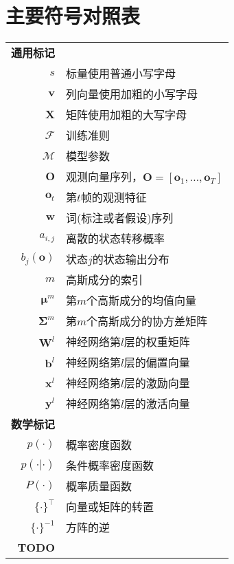 \chapter{主要符号对照表}
\label{chap:symb}

\begin{longtable}{rl}
\textbf{通用标记} \\
$s$ & 标量使用普通小写字母 \\
$\mathbf{v}$ & 列向量使用加粗的小写字母 \\
$\mathbf{X}$ & 矩阵使用加粗的大写字母 \\
$\mathcal{F}$ & 训练准则 \\
$\mathcal{M}$ & 模型参数 \\
$\mathbf{O}$ & 观测向量序列，$\mathbf{O}=[ \mathbf{o}_1, \dots, \mathbf{o}_T ]$ \\
$\mathbf{o}_t$ & 第$t$帧的观测特征 \\
$\mathbf{w}$ & 词(标注或者假设)序列 \\
$a_{i,j}$ & 离散的状态转移概率 \\
$b_j(\mathbf{o})$ & 状态$j$的状态输出分布 \\
$m$ & 高斯成分的索引 \\
$\bm{\mu}^{m}$ & 第$m$个高斯成分的均值向量 \\
$\bm{\Sigma}^{m}$ & 第$m$个高斯成分的协方差矩阵 \\
$\mathbf{W}^l$ & 神经网络第$l$层的权重矩阵 \\
$\mathbf{b}^l$ & 神经网络第$l$层的偏置向量 \\
$\mathbf{x}^l$ & 神经网络第$l$层的激励向量 \\
$\mathbf{y}^l$ & 神经网络第$l$层的激活向量 \\

\textbf{数学标记} \\
$p(\cdot)$ & 概率密度函数 \\
$p(\cdot|\cdot)$ & 条件概率密度函数 \\
$P(\cdot)$ & 概率质量函数 \\
$\{ \cdot \}^{\top}$ & 向量或矩阵的转置 \\
$\{ \cdot \}^{-1}$ & 方阵的逆 \\

\textbf{TODO} \\



\end{longtable}
